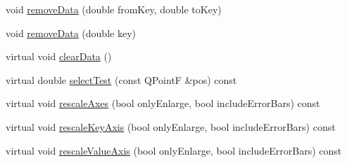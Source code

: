 \begin{DoxyCompactItemize}
\item 
void \hyperlink{classQCPGraph_a4a0fde50b7db9db0a85b5c5b6b10098f}{remove\-Data} (double from\-Key, double to\-Key)
\item 
void \hyperlink{classQCPGraph_a4a706020b4318f118381648ef18aca3f}{remove\-Data} (double key)
\item 
virtual void \hyperlink{classQCPGraph_ad4e94a4e44e5e76fbec81a72a977157d}{clear\-Data} ()
\item 
virtual double \hyperlink{classQCPGraph_a9a95048dc6daf83e45efbf6d2cdc92d7}{select\-Test} (const Q\-Point\-F \&pos) const 
\item 
virtual void \hyperlink{classQCPGraph_aa35b75b9032800d783df749c8a004ee9}{rescale\-Axes} (bool only\-Enlarge, bool include\-Error\-Bars) const 
\item 
virtual void \hyperlink{classQCPGraph_a2108a729046b0ab6e0516afb249dab13}{rescale\-Key\-Axis} (bool only\-Enlarge, bool include\-Error\-Bars) const 
\item 
virtual void \hyperlink{classQCPGraph_a2ba0e1df416486d7e74299ef8cf68bba}{rescale\-Value\-Axis} (bool only\-Enlarge, bool include\-Error\-Bars) const 
\end{DoxyCompactItemize}

